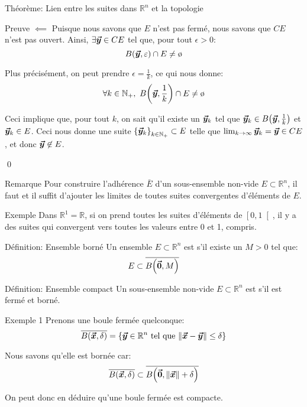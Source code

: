 \documentclass[a4paper]{article}
\begin{document}
\begin{parag}{Théorème: Lien entre les suites dans $\mathbb{R}^n$ et la topologie}
\begin{subparag}{Preuve $\impliedby$}
        Puisque nous savons que $E$ n'est pas fermé, nous savons que $CE$ n'est pas ouvert. Ainsi, $\exists \bm{\protect\vec{y}} \in CE$ tel que, pour tout $\epsilon > 0$:  
        \[B\left(\bvec{y}, \epsilon\right) \cap E \neq \o\]
        
        Plus précisément, on peut prendre $\epsilon = \frac{1}{k}$, ce qui nous donne:
        \[\forall k \in \mathbb{N}_+, \ B\left(\bvec{y}, \frac{1}{k}\right) \cap E \neq \o\]
        
        Ceci implique que, pour tout $k$, on sait qu'il existe un $\bm{\protect\vec{y}}_k$ tel que $\bvec{y}_k \in B\left(\bvec{y}, \frac{1}{k}\right)$ et $\bm{\protect\vec{y}}_k \in E$. Ceci nous donne une suite $\left\{\bvec{y}_k\right\}_{k \in \mathbb{N}_+} \subset E$ telle que $\lim_{k \to \infty} \bm{\protect\vec{y}}_k = \bm{\protect\vec{y}} \in CE$, et donc $\bm{\protect\vec{y}} \not\in E$.

        \qed
    \end{subparag}
\end{parag}

\begin{parag}{Remarque}
    Pour construire l'adhérence $\bar{E}$ d'un sous-ensemble non-vide $E \subset \mathbb{R}^n$, il faut et il suffit d'ajouter les limites de toutes suites convergentes d'éléments de $E$.

    \begin{subparag}{Exemple}
        Dans $\mathbb{R}^1 = \mathbb{R}$, si on prend toutes les suites d'éléments de $\left[0, 1\right[ $, il y a des suites qui convergent vers toutes les valeurs entre 0 et 1, compris.
    \end{subparag}
\end{parag}

\begin{parag}{Définition: Ensemble borné}
    Un ensemble $E \subset \mathbb{R}^n$ est  s'il existe un $M > 0$ tel que: 
    \[E \subset \bar{B\left(\bvec{0}, M\right)}\]
    
\end{parag}


\begin{parag}{Définition: Ensemble compact}
    Un sous-ensemble non-vide $E \subset \mathbb{R}^n$ est  s'il est fermé et borné.
\end{parag}

\begin{parag}{Exemple 1}
    Prenons une boule fermée quelconque: 
    \[\bar{B\left(\bvec{x}, \delta\right)} = \left\{\bvec{y} \in \mathbb{R}^n \telque \left\|\bvec{x} - \bvec{y}\right\| \leq \delta\right\}\]
    
    Nous savons qu'elle est bornée car: 
    \[\bar{B\left(\bvec{x} , \delta\right)} \subset \bar{B\left(\bvec{0}, \left\|\bvec{x}\right\| + \delta\right)}\]
    
    On peut donc en déduire qu'une boule fermée est compacte.
\end{parag}
\end{document}
